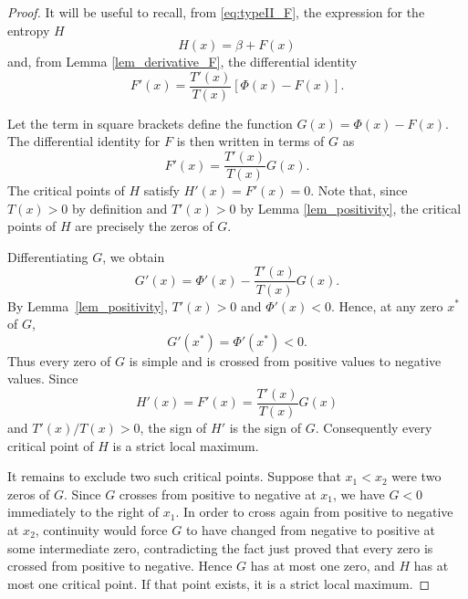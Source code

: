 \documentclass[10pt,a4paper]{amsart}
\theoremstyle{definition}
\theoremstyle{remark}
\numberwithin{equation}{section}
\begin{document}
\begin{proof}
It will be useful to recall, from \eqref{eq:typeII_F}, the expression for the entropy $H$
\[ H(x) = \beta+F(x) \]
and, from  Lemma \ref{lem_derivative_F}, the differential identity
\[
F'(x)
=
\frac{T'(x)}{T(x)}
[\Phi(x)-F(x)]. \]

\noindent Let the term in square brackets  define the function  $G(x)=\Phi(x) - F(x).$
\noindent The differential identity for \(F\) is then written in terms of $G$ as
\[
F'(x)
=
\frac{T'(x)}{T(x)}G(x).
\]
The critical points of \(H\) satisfy
$
H'(x)=F'(x)=0.
$
Note that, since $T(x) > 0$ by definition and  $T'(x) > 0$ by Lemma \ref{lem_positivity}, the critical points of $H$ are precisely the zeros of \(G\). 

Differentiating $G$, we obtain
\begin{equation}
G'(x)
=
\Phi'(x)-\frac{T'(x)}{T(x)}G(x).
\label{eq:typeII_Gprime}
\end{equation}
By Lemma~\ref{lem_positivity}, $T'(x)>0$ and $\Phi'(x)<0$. Hence, at any zero $x^\ast$ of $G$,
\[
G'(x^\ast)=\Phi'(x^\ast)<0.
\]
Thus every zero of $G$ is simple and is crossed from positive values to negative values. Since
\[
H'(x)=F'(x)=\frac{T'(x)}{T(x)}G(x)
\]
and $T'(x)/T(x)>0$, the sign of $H'$ is the sign of $G$. Consequently every critical point of $H$ is a strict local maximum.

It remains to exclude two such critical points. Suppose that $x_1<x_2$ were two zeros of $G$. Since $G$ crosses from positive to negative at $x_1$, we have $G<0$ immediately to the right of $x_1$. In order to cross again from positive to negative at $x_2$, continuity would force $G$ to have changed from negative to positive at some intermediate zero, contradicting the fact just proved that every zero is crossed from positive to negative. Hence $G$ has at most one zero, and $H$ has at most one critical point. If that point exists, it is a strict local maximum.



\end{proof}
\end{document}
